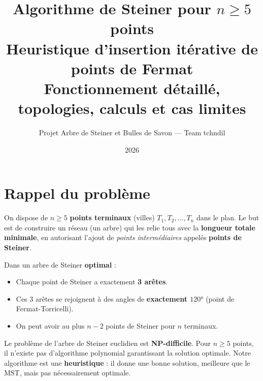 \documentclass[12pt,a4paper]{article}
\begin{document}
\title{%
  \textbf{Algorithme de Steiner pour $n \geq 5$ points}\\[0.4em]
  \large Heuristique d'insertion itérative de points de Fermat\\
  \normalsize Fonctionnement détaillé, topologies, calculs et cas limites
}
\author{Projet Arbre de Steiner et Bulles de Savon --- Team tchndil}
\date{2026}
\maketitle
\tableofcontents
\newpage

\section{Rappel du problème}

On dispose de $n \geq 5$ \textbf{points terminaux} (villes)
$T_1, T_2, \ldots, T_n$ dans le plan.
Le but est de construire un réseau (un arbre) qui les relie tous
avec la \textbf{longueur totale minimale}, en autorisant l'ajout de
\emph{points intermédiaires} appelés \textbf{points de Steiner}.

\begin{tcolorbox}[defbox={Propriété fondamentale des points de Steiner}]
Dans un arbre de Steiner \textbf{optimal} :
\begin{itemize}
  \item Chaque point de Steiner a exactement \textbf{3 arêtes}.
  \item Ces 3 arêtes se rejoignent à des angles de \textbf{exactement $120°$}
        (point de Fermat-Torricelli).
  \item On peut avoir au plus $n - 2$ points de Steiner pour $n$ terminaux.
\end{itemize}
\end{tcolorbox}

\begin{tcolorbox}[warnbox={Complexité}]
Le problème de l'arbre de Steiner euclidien est \textbf{NP-difficile}.
Pour $n \geq 5$ points, il n'existe pas d'algorithme polynomial garantissant
la solution optimale.
Notre algorithme est une \textbf{heuristique} : il donne une bonne solution,
meilleure que le MST, mais pas nécessairement optimale.
\end{tcolorbox}

\end{document}
